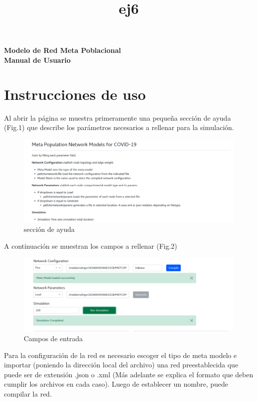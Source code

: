 \documentclass[a4paper,12pt]{article}
\begin{document}
 

\title{ej6}

\begin{titlepage}
	\centering
	\vspace*{\fill}
	\vspace*{0.5cm}
	\huge\bfseries
	Modelo de Red Meta Poblacional\\
	\vspace*{2cm}
	Manual de Usuario\\
	\vspace*{\fill}
\end{titlepage}

\section*{Instrucciones de uso}
Al abrir la página se muestra primeramente una pequeña sección de ayuda (Fig.1) que describe los parámetros necesarios a rellenar para la simulación.

\begin{figure}[H]
	\centering
	\includegraphics[width=0.9\linewidth]{./1}
	\caption{sección de ayuda}
	\label{Fig.1}
\end{figure}

A continuación se muestran los campos a rellenar (Fig.2)

\begin{figure}[H]
	\centering
	\includegraphics[width=0.9\linewidth]{./2}
	\caption{Campos de entrada}
	\label{Fig.2}
\end{figure}

Para la configuración de la red es necesario escoger el tipo de meta modelo e importar (poniendo la dirección local del archivo) una red preestablecida que puede ser de extensión .json o .xml (Más adelante se explica el formato que deben cumplir los archivos en cada caso). Luego de establecer un nombre, puede compilar la red.\\
\end{document}
